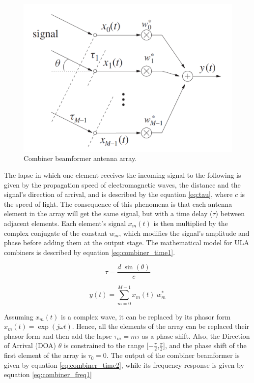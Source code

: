 \documentclass[12pt,a4paper]{report}
\begin{document}
\begin{figure}[h]
    \centering
    \includegraphics[scale = 0.7]{Figures/BF_RX_ULA.png}
    \caption[Combiner beamformer antenna array.]{Combiner beamformer antenna array. \cite{Liu2010}}
    \label{fig:combiner}
\end{figure}

The lapse in which one element receives the incoming signal to the following is given by the propagation speed of electromagnetic waves, the distance and the signal's direction of arrival, and is described by the equation \ref{eq:tau}, where $c$ is the speed of light. The consequence of this phenomena is that each antenna element in the array will get the same signal, but with a time delay ($\tau$) between adjacent elements. Each element's signal $x_{m}(t)$ is then multiplied by the complex conjugate of the constant $w_{m}$, which modifies the signal's amplitude and phase before adding them at the output stage. The mathematical model for ULA combiners is described by equation \ref{eq:combiner_time1}. \cite{Allen2005}

\begin{equation}
    \tau = \frac{d\:\sin(\theta)}{c}
    \label{eq:tau}
\end{equation}

\begin{equation}
    y(t) = \sum_{m=0}^{M-1}x_{m}(t)\:w_{m}^{*}
    \label{eq:combiner_time1}
\end{equation}

Assuming $x_{m}(t)$ is a complex wave, it can be replaced by its phasor form $x_{m}(t) = \exp(j\omega t)$. Hence, all the elements of the array can be replaced their phasor form and then add the lapse $\tau_{m} = m \tau$ as a phase shift. Also, the Direction of Arrival (DOA) $\theta$ is constrained to the range [$-\frac{\pi}{2}$,$\frac{\pi}{2}$], and the phase shift of the first element of the array is $\tau_{0} = 0$. The output of the combiner beamformer is given by equation \ref{eq:combiner_time2}, while its frequency response is given by equation \ref{eq:combiner_freq1}
\end{document}
